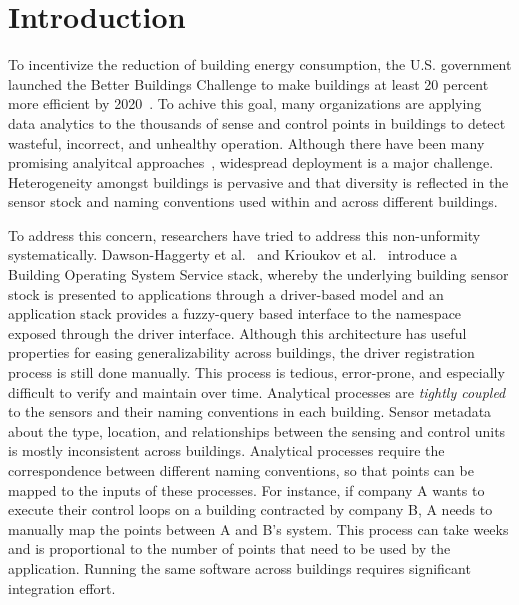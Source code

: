 \section{Introduction}

To incentivize the reduction of building energy consumption, the U.S. government 
launched the Better Buildings Challenge to make buildings at least 20 percent 
more efficient by 2020~\cite{doe2013better}. To achive this goal, many organizations 
are applying data analytics to the thousands of sense and control points in 
buildings to detect wasteful, incorrect, and unhealthy operation.  
Although there have been many promising analyitcal approaches~\cite{}, widespread deployment is a 
major challenge.  Heterogeneity amongst buildings is pervasive and that diversity is reflected
in the sensor stock and naming conventions used within and across different buildings.

To address this concern, researchers have tried to address this non-unformity systematically.
Dawson-Haggerty et al.~\cite{boss} and Krioukov et al.~\cite{bas}
introduce a Building Operating System Service stack, whereby
the underlying building sensor stock is presented to applications through a driver-based model and 
an application stack 
provides a fuzzy-query based interface to the namespace exposed through the driver interface.
Although this architecture has useful properties  for easing generalizability across
buildings, the driver registration process is still done manually. This process is tedious, error-prone, 
and especially difficult to verify and maintain over time.  
Analytical processes are \emph{tightly coupled} to the sensors and their naming conventions in each building. 
Sensor metadata about the type, location, and relationships between the sensing 
and control units is mostly inconsistent across buildings.
Analytical processes require the correspondence between different naming 
conventions, so that points can be mapped to the inputs of these processes.
For instance, if company A wants to execute their 
control loops on a building contracted by company B, A needs to manually 
map the points between A and B's system. This process can take weeks and is proportional 
to the number of points that need to be used by the application. Running the same software across 
buildings requires significant integration effort.



